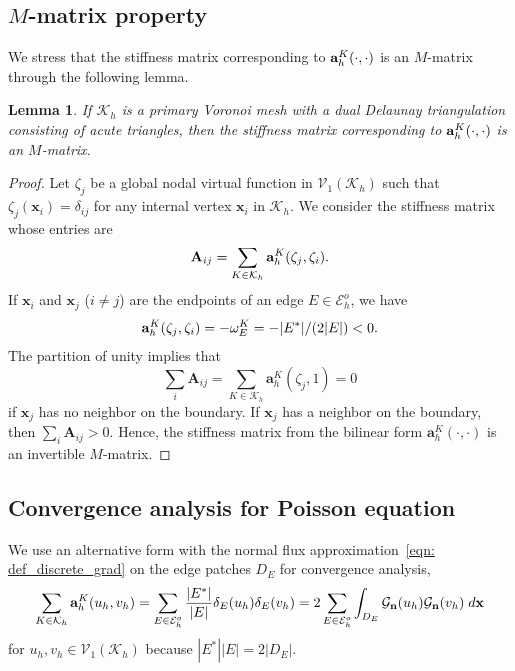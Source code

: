 \documentclass[a4paper]{article}
\theoremstyle{plain}
\newtheorem{lemma}[theorem]{Lemma}
\theoremstyle{definition}
\numberwithin{equation}{section}
\newcommand{\ba}{{\bf a}}
\newcommand{\bn}{{\bf n}}
\newcommand{\Kh}{\mathcal{K}_h}
\newcommand{\Eho}{\mathcal{E}_h^o}
\begin{document}

\subsection{$M$-matrix property}
We stress that the stiffness matrix corresponding to $\ba_h^K(\cdot,\cdot)$ is an $M$-matrix through the following lemma.
\begin{lemma}\label{lemma: fvm_m_matrix}
If $\Kh$ is a primary Voronoi mesh with a dual Delaunay triangulation consisting of acute triangles, then the stiffness matrix corresponding to $\ba_h^K(\cdot,\cdot)$ is an $M$-matrix.
\end{lemma}
\begin{proof}
Let $\zeta_j$ be a global nodal virtual function in $\mathcal V_1(\Kh)$ such that $\zeta_j(\mathbf{x}_i)=\delta_{ij}$ for any internal vertex $\mathbf{x}_i$ in $\Kh$.
We consider the stiffness matrix whose entries are
\begin{equation*}
\mathbf{A}_{ij}=\sum_{K\in\Kh}\ba_h^{K}(\zeta_j,\zeta_i).
\end{equation*}
If $\mathbf{x}_i$ and $\mathbf{x}_j$ ($i\not=j$) are the endpoints of an edge $E\in \Eho$, we have
\begin{equation*}
\ba_{h}^K(\zeta_j,\zeta_i)=-\omega_E^K=-|E^*|/(2|E|)<0.
\end{equation*}
The partition of unity implies that
\begin{equation*}
\sum_{i}\mathbf{A}_{ij}=\sum_{K\in\mathcal{K}_{h}^{}}\mathbf{a}_h^K(\zeta_j,1)=0
\end{equation*}
if $\mathbf{x}_j$ has no neighbor on the boundary.
If $\mathbf{x}_j$ has a neighbor on the boundary, then $\sum_i \mathbf{A}_{ij}>0$.
Hence, the stiffness matrix from the bilinear form $\mathbf{a}_{h}^K(\cdot,\cdot)$ is an invertible $M$-matrix.
\end{proof}




\subsection{Convergence analysis for Poisson equation}
We use an alternative form with the normal flux approximation~\eqref{eqn: def_discrete_grad} on the edge patches $D_E$ for convergence analysis,
\begin{equation}
\sum_{K\in\Kh}\mathbf{a}_h^K(u_h, v_h)=\sum_{E\in \Eho}\frac{|E^*|}{|E|}\delta_E(u_h)\delta_E(v_h)=2\sum_{E\in \Eho}\int_{D_E}\mathcal{G}_{\bn}(u_h)\mathcal{G}_{\bn}(v_h)\;{\rm d}\mathbf{x}\label{eqn: fvm_alt_form}
\end{equation}
for $u_h,v_h\in \mathcal V_1(\Kh)$ because $|E^*||E|=2|D_E|$.
\end{document}
